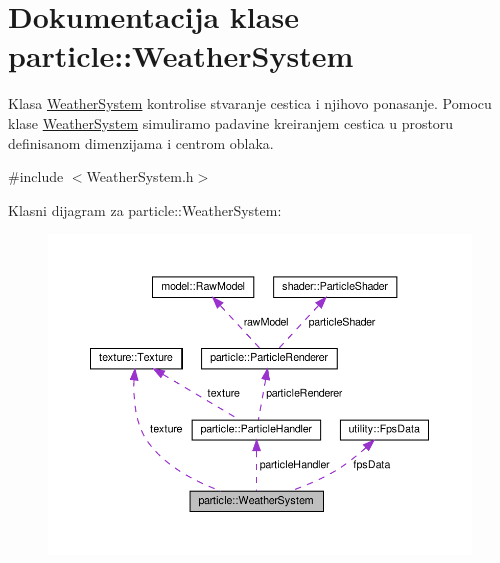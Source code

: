 \hypertarget{classparticle_1_1WeatherSystem}{}\section{Dokumentacija klase particle\+:\+:Weather\+System}
\label{classparticle_1_1WeatherSystem}


Klasa \hyperlink{classparticle_1_1WeatherSystem}{Weather\+System} kontrolise stvaranje cestica i njihovo ponasanje. Pomocu klase \hyperlink{classparticle_1_1WeatherSystem}{Weather\+System} simuliramo padavine kreiranjem cestica u prostoru definisanom dimenzijama i centrom oblaka.  




{\ttfamily \#include $<$Weather\+System.\+h$>$}



Klasni dijagram za particle\+:\+:Weather\+System\+:
\nopagebreak
\begin{figure}[H]
\begin{center}
\leavevmode
\includegraphics[width=350pt]{classparticle_1_1WeatherSystem__coll__graph}
\end{center}
\end{figure}
